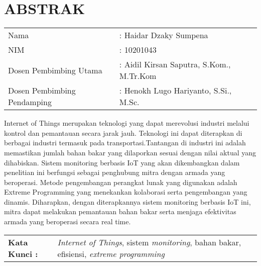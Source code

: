 \chapter*{ABSTRAK}
\begin{table}[h]
    \begin{tabular}
        {
            p{}
            p{}
            }
            \\
            Nama & : Haidar Dzaky Sumpena
            \\
            NIM & : 10201043
            \\
            Dosen Pembimbing Utama &
            : Aidil Kirsan Saputra, S.Kom., M.Tr.Kom
            \\
            Dosen Pembimbing Pendamping &
            : Henokh Lugo Hariyanto, S.Si., M.Sc.
        \end{tabular}
    \end{table}

Internet of Things merupakan teknologi yang dapat merevolusi industri melalui kontrol dan pemantauan secara jarak jauh. Teknologi ini dapat diterapkan di berbagai industri termasuk pada transportasi.Tantangan di industri ini adalah memastikan jumlah bahan bakar yang dilaporkan sesuai dengan nilai aktual yang dihabiskan. Sistem monitoring berbasis IoT yang akan dikembangkan dalam penelitian ini berfungsi sebagai penghubung mitra dengan armada yang beroperasi. Metode pengembangan perangkat lunak yang digunakan adalah Extreme Programming yang menekankan kolaborasi serta pengembangan yang dinamis. Diharapkan, dengan diterapkannya sistem monitoring berbasis IoT ini, mitra dapat melakukan pemantauan bahan bakar serta menjaga efektivitas armada yang beroperasi secara real time.


\begin{table}[h]
    \begin{tabular}{ p{} p{} }
        \\
        \textbf{Kata Kunci :} & \textit{Internet of Things}, sistem \textit{monitoring}, bahan bakar, efisiensi, \textit{extreme programming}
    \end{tabular}
\end{table}
